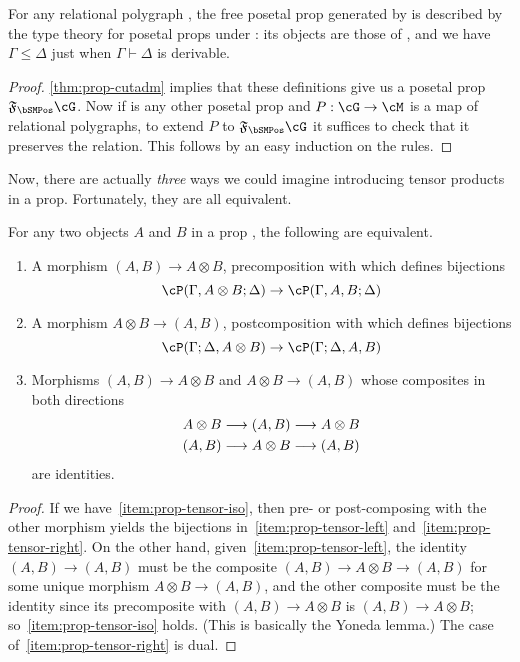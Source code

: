 \documentclass{book}
\let\types\vdash
\newcommand{\F}[1]{\mathfrak{F}_{#1}}
\let\tensor\otimes
\begin{document}
\begin{thm}\label{thm:posprop-initial}
  For any relational polygraph \cG, the free posetal prop generated by \cG is described by the type theory for posetal props under \cG: its objects are those of \cG, and we have $\Gamma\le\Delta$ just when $\Gamma\types\Delta$ is derivable.
\end{thm}
\begin{proof}
  \cref{thm:prop-cutadm} implies that these definitions give us a posetal prop $\F\bSMPos\cG$.
  Now if \cM is any other posetal prop and $P:\cG\to\cM$ is a map of relational polygraphs, to extend $P$ to $\F\bSMPos\cG$ it suffices to check that it preserves the relation.
  This follows by an easy induction on the rules.
\end{proof}

Now, there are actually \emph{three} ways we could imagine introducing tensor products in a prop.
Fortunately, they are all equivalent.

\begin{lem}\label{thm:prop-tensor}
  For any two objects $A$ and $B$ in a prop \cP, the following are equivalent.
  \begin{enumerate}
  \item A morphism $(A,B) \to A\tensor B$, precomposition with which defines bijections\label{item:prop-tensor-left}
    \[ \cP(\Gamma,A\tensor B;\Delta) \to \cP(\Gamma,A,B;\Delta) \]
  \item A morphism $A\tensor B \to (A,B)$, postcomposition with which defines bijections\label{item:prop-tensor-right}
    \[ \cP(\Gamma;\Delta,A\tensor B) \to \cP(\Gamma;\Delta,A,B) \]
  \item Morphisms $(A,B) \to A\tensor B$ and $A\tensor B \to (A,B)$ whose composites in both directions
    \begin{gather*}
      A\tensor B \too (A,B)  \too A\tensor B\\
      (A,B)\too A\tensor B \too (A,B)
    \end{gather*}
    are identities.\label{item:prop-tensor-iso}
  \end{enumerate}
\end{lem}
\begin{proof}
  If we have~\ref{item:prop-tensor-iso}, then pre- or post-composing with the other morphism yields the bijections in~\ref{item:prop-tensor-left} and~\ref{item:prop-tensor-right}.
  On the other hand, given~\ref{item:prop-tensor-left}, the identity $(A,B)\to (A,B)$ must be the composite $(A,B)\to A\tensor B \to (A,B)$ for some unique morphism $A\tensor B \to (A,B)$, and the other composite must be the identity since its precomposite with $(A,B)\to A\tensor B$ is $(A,B)\to A\tensor B$; so~\ref{item:prop-tensor-iso} holds.
  (This is basically the Yoneda lemma.)
  The case of~\ref{item:prop-tensor-right} is dual.
\end{proof}
\end{document}

